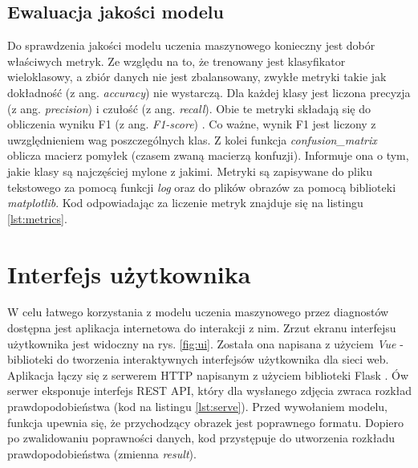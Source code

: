 \subsection{Ewaluacja jakości modelu}

Do sprawdzenia jakości modelu uczenia maszynowego konieczny jest dobór właściwych metryk.
Ze względu na to, że trenowany jest klasyfikator wieloklasowy, a zbiór danych nie jest zbalansowany, zwykłe metryki takie jak dokładność (z ang. \textit{accuracy}) nie wystarczą.
Dla każdej klasy jest liczona precyzja (z ang. \textit{precision}) i czułość (z ang. \textit{recall}).
Obie te metryki składają się do obliczenia wyniku F1 (z ang. \textit{F1-score}) \cite{geron}.
Co ważne, wynik F1 jest liczony z uwzględnieniem wag poszczególnych klas.
Z kolei funkcja \textit{confusion\_matrix} oblicza macierz pomyłek (czasem zwaną macierzą konfuzji).
Informuje ona o tym, jakie klasy są najczęściej mylone z jakimi.
Metryki są zapisywane do pliku tekstowego za pomocą funkcji \textit{log} oraz do plików obrazów za pomocą biblioteki \textit{matplotlib}.
Kod odpowiadając za liczenie metryk znajduje się na listingu \ref{lst:metrics}.


\section{Interfejs użytkownika}

W celu łatwego korzystania z modelu uczenia maszynowego przez diagnostów dostępna jest aplikacja internetowa do interakcji z nim.
Zrzut ekranu interfejsu użytkownika jest widoczny na rys. \ref{fig:ui}.
Została ona napisana z użyciem \textit{Vue} \cite{vue} - biblioteki do tworzenia interaktywnych interfejsów użytkownika dla sieci web.
Aplikacja łączy się z serwerem HTTP napisanym z użyciem biblioteki Flask \cite{flask}.
Ów serwer eksponuje interfejs REST API, który dla wysłanego zdjęcia zwraca rozkład prawdopodobieństwa (kod na listingu \ref{lst:serve}).
Przed wywołaniem modelu, funkcja upewnia się, że przychodzący obrazek jest poprawnego formatu.
Dopiero po zwalidowaniu poprawności danych, kod przystępuje do utworzenia rozkładu prawdopodobieństwa (zmienna \textit{result}).




